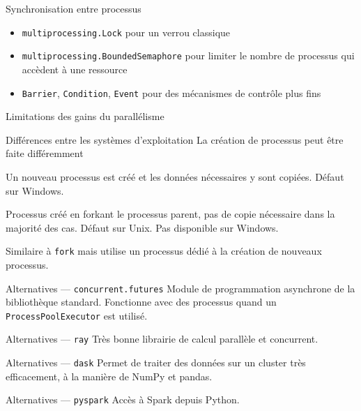 \begin{frame}{Synchronisation entre processus}
  \begin{itemize}[<+->]
    \item \texttt{multiprocessing.Lock} pour un verrou classique
    \item \texttt{multiprocessing.BoundedSemaphore} pour limiter le nombre de processus qui accèdent à une ressource
    \item \texttt{Barrier}, \texttt{Condition}, \texttt{Event} pour des mécanismes de contrôle plus fins
  \end{itemize}

\end{frame}

\begin{frame}{Limitations des gains du parallélisme}
\end{frame}

\begin{frame}{Différences entre les systèmes d'exploitation}
  La création de processus peut être faite différemment

  \begin{description}[<+->]
    \item[\texttt{spawn}] Un nouveau processus est créé et les données nécessaires y sont copiées. Défaut sur Windows.
    \item[\texttt{fork}] Processus créé en forkant le processus parent, pas de copie nécessaire dans la majorité des cas. Défaut sur Unix. Pas disponible sur Windows.
    \item[\texttt{forkserver}] Similaire à \texttt{fork} mais utilise un processus dédié à la création de nouveaux processus.
  \end{description}
\end{frame}

\begin{frame}{Alternatives --- \texttt{concurrent.futures}}
  Module de programmation asynchrone de la bibliothèque standard. Fonctionne avec des processus quand un \texttt{ProcessPoolExecutor} est utilisé.
\end{frame}

\begin{frame}{Alternatives --- \texttt{ray}}
  Très bonne librairie de calcul parallèle et concurrent.
\end{frame}

\begin{frame}{Alternatives --- \texttt{dask}}
  Permet de traiter des données sur un cluster très efficacement, à la manière de NumPy et pandas.
\end{frame}

\begin{frame}{Alternatives --- \texttt{pyspark}}
  Accès à Spark depuis Python.
\end{frame}
